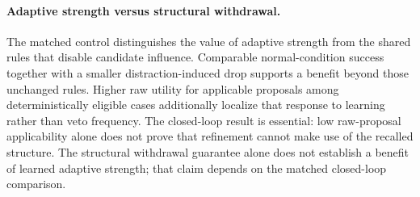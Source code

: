 \paragraph{Adaptive strength versus structural withdrawal.}
The matched control distinguishes the value of adaptive strength from the shared rules that disable candidate influence.
Comparable normal-condition success together with a smaller distraction-induced drop supports a benefit beyond those unchanged rules.
Higher raw utility for applicable proposals among deterministically eligible cases additionally localize that response to learning rather than veto frequency.
The closed-loop result is essential: low raw-proposal applicability alone does not prove that refinement cannot make use of the recalled structure.
The structural withdrawal guarantee alone does not establish a benefit of learned adaptive strength; that claim depends on the matched closed-loop comparison.
